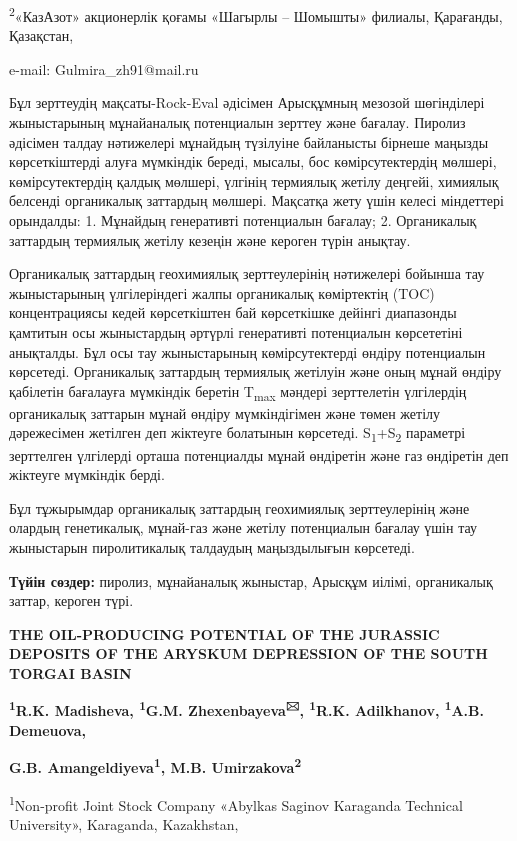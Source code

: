 \textsuperscript{2}«КазАзот» акционерлік қоғамы «Шагырлы -- Шомышты»
филиалы, Қарағанды, Қазақстан,

e-mail: Gulmira\_zh91@mail.ru

Бұл зерттеудің мақсаты-Rock-Eval әдісімен Арысқұмның мезозой шөгінділері
жыныстарының мұнайаналық потенциалын зерттеу және бағалау. Пиролиз
әдісімен талдау нәтижелері мұнайдың түзілуіне байланысты бірнеше маңызды
көрсеткіштерді алуға мүмкіндік береді, мысалы, бос көмірсутектердің
мөлшері, көмірсутектердің қалдық мөлшері, үлгінің термиялық жетілу
деңгейі, химиялық белсенді органикалық заттардың мөлшері. Мақсатқа жету
үшін келесі міндеттері орындалды: 1. Мұнайдың генеративті потенциалын
бағалау; 2. Органикалық заттардың термиялық жетілу кезеңін және кероген
түрін анықтау.

Органикалық заттардың геохимиялық зерттеулерінің нәтижелері бойынша тау
жыныстарының үлгілеріндегі жалпы органикалық көміртектің (TOC)
концентрациясы кедей көрсеткіштен бай көрсеткішке дейінгі диапазонды
қамтитын осы жыныстардың әртүрлі генеративті потенциалын көрсететіні
анықталды. Бұл осы тау жыныстарының көмірсутектерді өндіру потенциалын
көрсетеді. Органикалық заттардың термиялық жетілуін және оның мұнай
өндіру қабілетін бағалауға мүмкіндік беретін T\textsubscript{max}
мәндері зерттелетін үлгілердің органикалық заттарын мұнай өндіру
мүмкіндігімен және төмен жетілу дәрежесімен жетілген деп жіктеуге
болатынын көрсетеді. S\textsubscript{1}+S\textsubscript{2} параметрі
зерттелген үлгілерді орташа потенциалды мұнай өндіретін және газ
өндіретін деп жіктеуге мүмкіндік берді.

Бұл тұжырымдар органикалық заттардың геохимиялық зерттеулерінің және
олардың генетикалық, мұнай-газ және жетілу потенциалын бағалау үшін тау
жыныстарын пиролитикалық талдаудың маңыздылығын көрсетеді.

{\bfseries Түйін сөздер:} пиролиз, мұнайаналық жыныстар, Арысқұм иілімі,
органикалық заттар, кероген түрі.

{\bfseries THE OIL-PRODUCING POTENTIAL OF THE JURASSIC DEPOSITS OF THE
ARYSKUM DEPRESSION OF THE SOUTH TORGAI BASIN}

{\bfseries \textsuperscript{1}R.K. Madisheva, \textsuperscript{1}G.M.
Zhexenbayeva\textsuperscript{🖂}, \textsuperscript{1}R.K. Adilkhanov,
\textsuperscript{1}A.B. Demeuova,}

{\bfseries G.B. Amangeldiyeva\textsuperscript{1}, M.B.
Umirzakova\textsuperscript{2}}

\textsuperscript{1}Non-profit Joint Stock Company «Abylkas Saginov
Karaganda Technical University», Karaganda, Kazakhstan,

